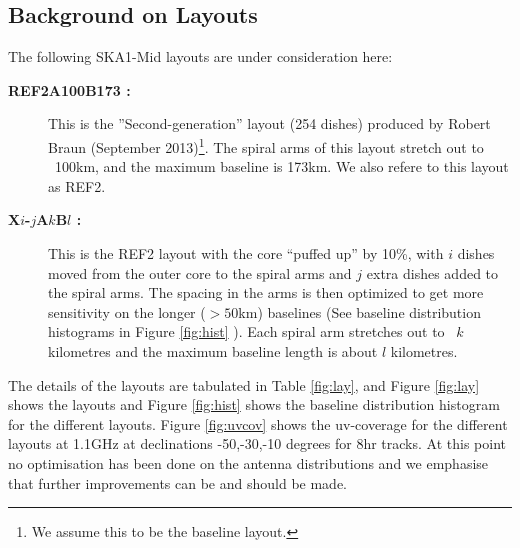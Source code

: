 \documentclass[sfheadings,a4paper,10pt,floats,floatfix]{article}
\begin{document}
\subsection{Background on Layouts}\label{sec:layouts}
The following SKA1-Mid layouts are under consideration here:
\begin{description}
\item[{\bf REF2A100B173 :}] This is the ”Second-generation” layout (254 dishes) produced by Robert Braun (September
2013)\footnote{We assume this to be the baseline layout.}. The spiral arms of this layout stretch out to ~100km, and the maximum
baseline is 173km. We also refere to this layout as REF2. 
\item[{\bf X$i$-$j$A$k$B$l$ :}] This is the REF2 layout with the core ``puffed up'' by 10\%, with $i$ dishes moved from
the outer core to the spiral arms and $j$ extra dishes added to the spiral arms. The spacing in the arms is then optimized to get
more sensitivity on the longer ($>50$km) baselines (See baseline distribution histograms in Figure \ref{fig:hist} ). Each spiral
arm stretches out to ~$k$ kilometres and the maximum baseline length is about $l$ kilometres.
\end{description}
The details of the layouts are tabulated in Table \ref{fig:lay}, and Figure \ref{fig:lay} shows the layouts and Figure
\ref{fig:hist} shows the baseline distribution histogram for the different layouts. Figure \ref{fig:uvcov} shows the uv-coverage
for the different layouts at 1.1GHz at declinations -50,-30,-10 degrees for 8hr tracks. At this point no optimisation has been
done on the antenna distributions and we emphasise that further improvements can be and should be made.
\end{document}
